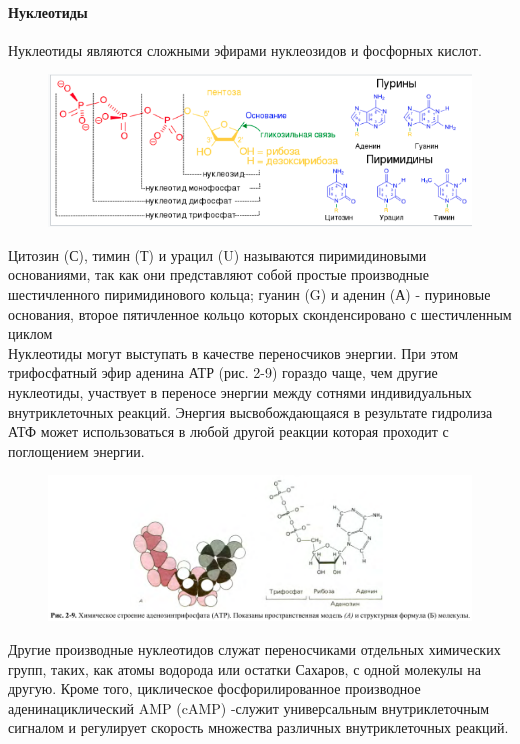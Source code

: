 \documentclass[a4paper, 12pt]{article}
\begin{document}
	\paragraph{Нуклеотиды} Нуклеотиды являются сложными эфирами нуклеозидов и фосфорных кислот.
	\begin{figure}[H]
		\includegraphics[scale = 0.7]{2nucle}
	\end{figure}
	Цитозин (С), тимин (Т) и урацил (U)
	называются пиримидиновыми основаниями, так как они представляют собой простые производные шестичленного пиримидинового кольца;
	гуанин (G) и аденин (А) - пуриновые основания, второе пятичленное кольцо которых сконденсировано с шестичленным циклом\\
	Нуклеотиды могут выступать в качестве переносчиков энергии. При этом трифосфатный эфир аденина АТР (рис. 2-9) гораздо чаще, чем
	другие нуклеотиды, участвует в переносе энергии между сотнями индивидуальных внутриклеточных реакций. Энергия высвобождающаяся в результате гидролиза АТФ может использоваться в любой другой реакции которая проходит с поглощением энергии.
	\begin{figure}[H]
		\includegraphics[scale=0.4]{2atf}
	\end{figure}
	Другие производные
	нуклеотидов служат переносчиками отдельных химических групп, таких, как атомы водорода или остатки Сахаров, с одной молекулы на другую. Кроме того, циклическое фосфорилированное производное аденинациклический AMP (cAMP) -служит универсальным внутриклеточным сигналом и
	регулирует скорость множества различных внутриклеточных реакций. \\
	
\end{document}
